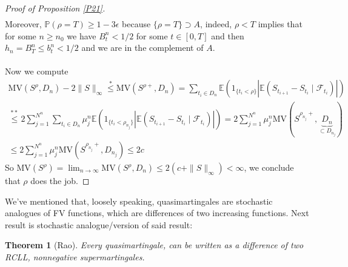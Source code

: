 \documentclass[12pt,a4paper, twoside]{article}
\newtheorem{thm}{Theorem}[section]
\theoremstyle{definition}
\newcommand{\EE}{\mathbb{E}} %
\newcommand{\PP}{\mathbb{P}} %
\newcommand{\MV}{\text{MV}}
\begin{document}
\begin{proof}[Proof of Proposition \ref{P21}]
\begin{align*}
\end{align*}
Moreover, $\PP( \rho = T) \geq 1- 3 \epsilon$ because $\{ \rho = T\} \supset A$, indeed, $\rho < T$ implies that for some $n \geq n_0$ we have $B_t^n < 1/2$ for some $t \in [0,T]$ and then $h_n= B_T^n \leq b_t^n < 1/2$ and we are in the complement of $A$. \\
\\
Now we compute 
\begin{align*}
\MV(S^\rho, D_n) -2 \|S\|_\infty \overset{*}\leq \MV(S^{\rho+}, D_n) = \sum_{t_i \in D_n} \EE(1_{\{t_i < \rho\}} | \EE(S_{t_{i+1}}-S_{t_i} \mid \mathcal{F}_{t_i})|) \\
\overset{**}\leq 2 \sum_{j=1}^{N^n} \sum_{t_i \in D_n} \mu_j^n \EE(1_{\{t_i < \rho_{n_j}\}} | \EE(S_{t_{i+1}}-S_{t_i} \mid \mathcal{F}_{t_i})|) = 2 \sum_{j=1}^{N^n} \mu_j^n \MV(S^{\rho_{n_j}+}, \underbrace{D_n}_{\subset D_{n_j}}) \\
\leq 2 \sum_{j=1}^{N^n} \mu_j^n \MV(S^{\rho_{n_j}+}, D_{n_j}) \leq 2 c
\end{align*}
So $\MV(S^\rho)= \lim_{n \to \infty} \MV(S^\rho, D_n) \leq 2 (c + \|S\|_\infty) < \infty$, we conclude that $\rho$ does the job. 
\end{proof}
\newpage
We've mentioned that, loosely speaking, quasimartingales are stochastic analogues of FV functions, which are differences of two increasing functions. Next result is stochastic analogue/version of said result: 
\begin{thm}[Rao] \label{T23} Every quasimartingale, can be written as a difference of two RCLL, nonnegative supermartingales. 
\end{thm}
\end{document}

